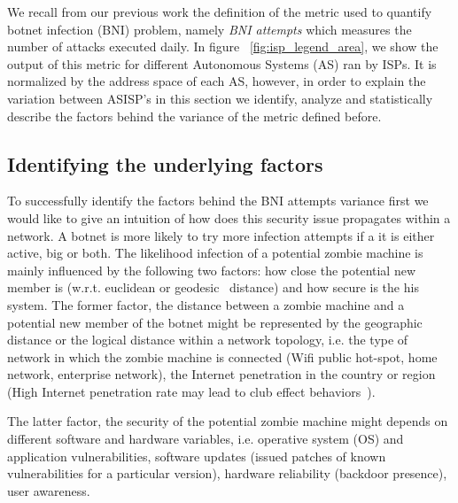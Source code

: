 


We recall from our previous work the definition of the metric used to quantify botnet infection (BNI) problem, namely \textit{BNI attempts} which measures the number of attacks executed daily. In figure ~\ref{fig:isp_legend_area}, we show the output of this metric for different Autonomous Systems (AS) ran by ISPs. It is normalized by the address space of each AS, however, in order to explain the variation between AS\/ISP's in this section we identify, analyze and statistically describe the factors behind the variance of the metric defined before.

\subsection{Identifying the underlying factors}
To successfully identify the factors behind the BNI attempts variance first we would like to give an intuition of how does this security issue propagates within a network. A botnet is more likely to try more infection attempts if a it is either active, big or both. The likelihood infection of a potential zombie machine is mainly influenced by the following two factors: how close the potential new member is (w.r.t. euclidean or geodesic~\cite{geodesic} distance) and how secure is the his system.
The former factor, the distance between a zombie machine and a potential new member of the botnet might be represented by the geographic distance or the logical distance within a network topology, i.e. the type of network in which the zombie machine is connected (Wifi public hot-spot, home network, enterprise network), the Internet penetration in the country or region (High Internet penetration rate may lead to club effect behaviors~\cite{club_effects}).

The latter factor, the security of the potential zombie machine might depends on different software and hardware variables, i.e. operative system (OS) and application vulnerabilities, software updates (issued patches of known vulnerabilities for a particular version), hardware reliability (backdoor presence), user awareness.

